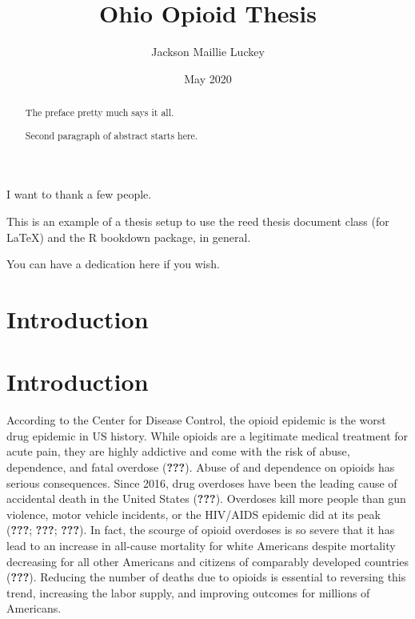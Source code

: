 \documentclass[12pt,twoside]{reedthesis}
\title{Ohio Opioid Thesis}
\author{Jackson Maillie Luckey}
\date{May 2020}
\begin{document}
  \maketitle

\frontmatter %
\pagestyle{empty} %
  \begin{acknowledgements}
    I want to thank a few people.
  \end{acknowledgements}
  \begin{preface}
    This is an example of a thesis setup to use the reed thesis document class
    (for LaTeX) and the R bookdown package, in general.
  \end{preface}
  \hypersetup{linkcolor=black}
  \setcounter{tocdepth}{2}
  \tableofcontents

  \listoftables

  \listoffigures
  \begin{abstract}
    The preface pretty much says it all.
    
    \par
    
    Second paragraph of abstract starts here.
  \end{abstract}
  \begin{dedication}
    You can have a dedication here if you wish.
  \end{dedication}
\mainmatter %
\pagestyle{fancyplain} %

\hypertarget{introduction}{%
\chapter*{Introduction}\label{introduction}}

\hypertarget{introduction-1}{%
\chapter{Introduction}\label{introduction-1}}

According to the Center for Disease Control, the opioid epidemic is the worst drug epidemic in US history. While opioids are a legitimate medical treatment for acute pain, they are highly addictive and come with the risk of abuse, dependence, and fatal overdose ({\textbf{???}}). Abuse of and dependence on opioids has serious consequences. Since 2016, drug overdoses have been the leading cause of accidental death in the United States ({\textbf{???}}). Overdoses kill more people than gun violence, motor vehicle incidents, or the HIV/AIDS epidemic did at its peak ({\textbf{???}}; {\textbf{???}}; {\textbf{???}}). In fact, the scourge of opioid overdoses is so severe that it has lead to an increase in all-cause mortality for white Americans despite mortality decreasing for all other Americans and citizens of comparably developed countries ({\textbf{???}}). Reducing the number of deaths due to opioids is essential to reversing this trend, increasing the labor supply, and improving outcomes for millions of Americans.
\end{document}
